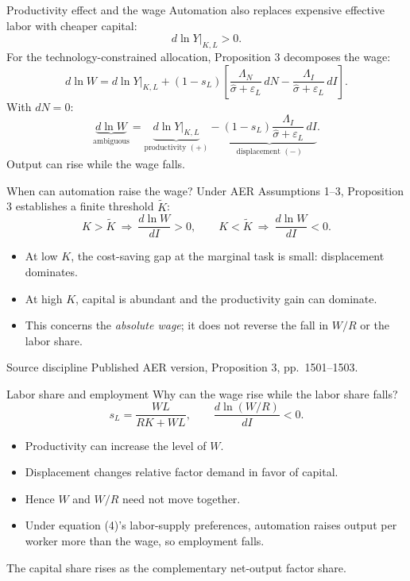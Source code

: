 \documentclass[aspectratio=169,10pt]{beamer}
\newcommand{\Ktilde}{\widetilde K}
\newcommand{\sigHat}{\widehat\sigma}
\begin{document}
\begin{frame}{Productivity effect and the wage}
Automation also replaces expensive effective labor with cheaper capital:
\[
 d\ln Y\big|_{K,L}>0.
\]
For the technology-constrained allocation, Proposition 3 decomposes the wage:
\[
d\ln W=d\ln Y\big|_{K,L}
+(1-s_L)\left[
\frac{\Lambda_N}{\sigHat+\varepsilon_L}\,dN
-\frac{\Lambda_I}{\sigHat+\varepsilon_L}\,dI
\right].
\]
With $dN=0$:
\[
\underbrace{d\ln W}_{\text{ambiguous}}
=\underbrace{d\ln Y\big|_{K,L}}_{\text{productivity }(+)}
-\underbrace{(1-s_L)\frac{\Lambda_I}{\sigHat+\varepsilon_L}\,dI}
_{\text{displacement }(-)}.
\]
Output can rise while the wage falls.
\end{frame}

\begin{frame}{When can automation raise the wage?}
Under AER Assumptions 1--3, Proposition 3 establishes a finite threshold
$\Ktilde$:
\[
  K>\Ktilde \ \Longrightarrow\ \frac{d\ln W}{dI}>0,
  \qquad
  K<\Ktilde \ \Longrightarrow\ \frac{d\ln W}{dI}<0.
\]
\begin{itemize}
  \item At low $K$, the cost-saving gap at the marginal task is small:
        displacement dominates.
  \item At high $K$, capital is abundant and the productivity gain can dominate.
  \item This concerns the \emph{absolute wage}; it does not reverse the fall in
        $W/R$ or the labor share.
\end{itemize}
\begin{alertblock}{Source discipline}
Published AER version, Proposition 3, pp.~1501--1503.
\end{alertblock}
\end{frame}

\begin{frame}{Labor share and employment}
Why can the wage rise while the labor share falls?
\[
  s_L=\frac{WL}{RK+WL},
  \qquad
  \frac{d\ln(W/R)}{dI}<0.
\]
\begin{itemize}
  \item Productivity can increase the level of $W$.
  \item Displacement changes relative factor demand in favor of capital.
  \item Hence $W$ and $W/R$ need not move together.
  \item Under equation (4)'s labor-supply preferences, automation raises output
        per worker more than the wage, so employment falls.
\end{itemize}
The capital share rises as the complementary net-output factor share.
\end{frame}
\end{document}
